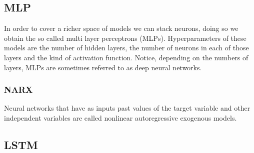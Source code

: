 \subsection{MLP}
In order to cover a richer space of models we can stack neurons, doing so we obtain the so called multi layer perceptrons (MLPs). Hyperparameters of these models are the number of hidden layers, the number of neurons in each of those layers and the kind of activation function.
Notice, depending on the numbers of layers, MLPs are sometimes referred to as deep neural networks.

\subsubsection{NARX}
Neural networks that have as inputs past values of the target variable and other independent variables are called nonlinear autoregressive exogenous models.

\subsection{LSTM}


